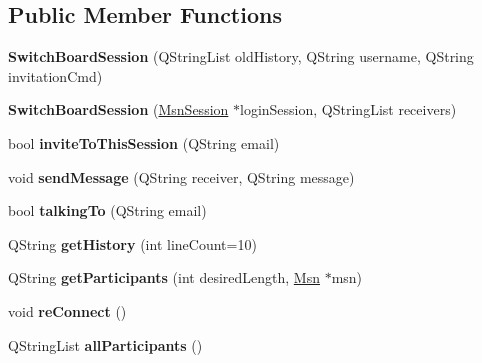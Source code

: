 \subsection*{Public Member Functions}
\begin{DoxyCompactItemize}
\item 
\hypertarget{classSwitchBoardSession_aa54467cc9f5d064a69811c3a4154b16c}{
{\bfseries SwitchBoardSession} (QStringList oldHistory, QString username, QString invitationCmd)}
\label{classSwitchBoardSession_aa54467cc9f5d064a69811c3a4154b16c}

\item 
\hypertarget{classSwitchBoardSession_a534b510235d697ceafada3974dcfa857}{
{\bfseries SwitchBoardSession} (\hyperlink{classMsnSession}{MsnSession} $\ast$loginSession, QStringList receivers)}
\label{classSwitchBoardSession_a534b510235d697ceafada3974dcfa857}

\item 
\hypertarget{classSwitchBoardSession_a7f73fbeb8b9b45d2772afeb6b3cb5b73}{
bool {\bfseries inviteToThisSession} (QString email)}
\label{classSwitchBoardSession_a7f73fbeb8b9b45d2772afeb6b3cb5b73}

\item 
\hypertarget{classSwitchBoardSession_a9ca703d0ab2ec0dcae5a8470956a87cb}{
void {\bfseries sendMessage} (QString receiver, QString message)}
\label{classSwitchBoardSession_a9ca703d0ab2ec0dcae5a8470956a87cb}

\item 
\hypertarget{classSwitchBoardSession_a9c1425df82566eafe57309c7d3e47093}{
bool {\bfseries talkingTo} (QString email)}
\label{classSwitchBoardSession_a9c1425df82566eafe57309c7d3e47093}

\item 
\hypertarget{classSwitchBoardSession_a719f587f8b2513b230b2b84949a5e040}{
QString {\bfseries getHistory} (int lineCount=10)}
\label{classSwitchBoardSession_a719f587f8b2513b230b2b84949a5e040}

\item 
\hypertarget{classSwitchBoardSession_a6ef53d9017746e9a30161577c6323bf6}{
QString {\bfseries getParticipants} (int desiredLength, \hyperlink{classMsn}{Msn} $\ast$msn)}
\label{classSwitchBoardSession_a6ef53d9017746e9a30161577c6323bf6}

\item 
\hypertarget{classSwitchBoardSession_afc5f702d461af16fb670ddea68552f21}{
void {\bfseries reConnect} ()}
\label{classSwitchBoardSession_afc5f702d461af16fb670ddea68552f21}

\item 
\hypertarget{classSwitchBoardSession_a865139408af38ed43cee1a572d5749fc}{
QStringList {\bfseries allParticipants} ()}
\label{classSwitchBoardSession_a865139408af38ed43cee1a572d5749fc}

\end{DoxyCompactItemize}
